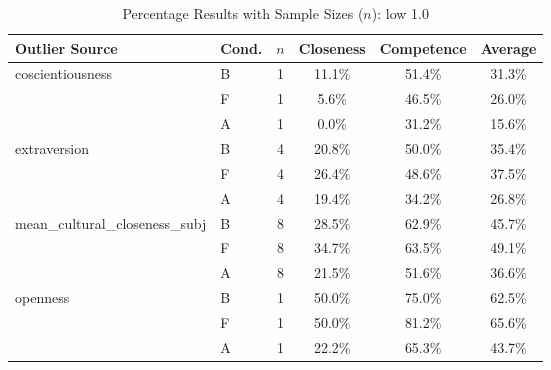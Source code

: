 \begin{table}[ht]
    \centering
    \caption{Percentage Results with Sample Sizes ($n$): low 1.0}
    \begin{tabular}{l l c c c c}
        \toprule
        \textbf{Outlier Source} & \textbf{Cond.} & \textbf{$n$} & \textbf{Closeness} & \textbf{Competence} & \textbf{Average} \\
        \midrule
        coscientiousness & B & 1 & 11.1\% & 51.4\% & 31.3\% \\
         & F & 1 & 5.6\% & 46.5\% & 26.0\% \\
         & A & 1 & 0.0\% & 31.2\% & 15.6\% \\
        \addlinespace
        extraversion & B & 4 & 20.8\% & 50.0\% & 35.4\% \\
         & F & 4 & 26.4\% & 48.6\% & 37.5\% \\
         & A & 4 & 19.4\% & 34.2\% & 26.8\% \\
        \addlinespace
        mean\_cultural\_closeness\_subj & B & 8 & 28.5\% & 62.9\% & 45.7\% \\
         & F & 8 & 34.7\% & 63.5\% & 49.1\% \\
         & A & 8 & 21.5\% & 51.6\% & 36.6\% \\
        \addlinespace
        openness & B & 1 & 50.0\% & 75.0\% & 62.5\% \\
         & F & 1 & 50.0\% & 81.2\% & 65.6\% \\
         & A & 1 & 22.2\% & 65.3\% & 43.7\% \\
        \bottomrule
    \end{tabular}
\end{table}